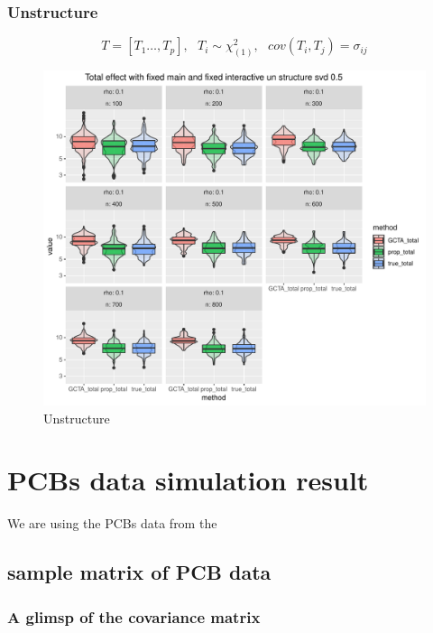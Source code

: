 \documentclass[]{article}
\begin{document}
\subsubsection{Unstructure}\label{unstructure}

\[
  T = [T_1 \dots, T_p] ,~~~ T_i \sim \chi_{(1)}^2, ~~~ cov(T_i, T_j) = \sigma_{ij}
\]

\begin{figure}
\centering
\includegraphics{./generate_graph_as_pdf/plot_chi_fixed_fixed_total_un_chi_rho_0.1_0.9_n_100_800_p_34_svd_0.5.pdf}
\caption{Unstructure}
\end{figure}

\newpage

\section{PCBs data simulation result}\label{pcbs-data-simulation-result}

We are using the PCBs data from the

\subsection{sample matrix of PCB data}\label{sample-matrix-of-pcb-data}

\subsubsection{A glimsp of the covariance
matrix}\label{a-glimsp-of-the-covariance-matrix}
\end{document}
